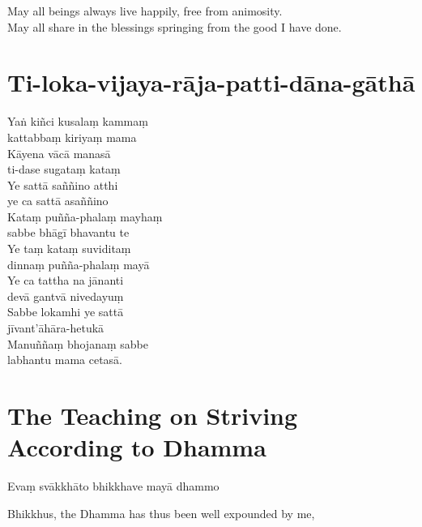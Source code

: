 \begin{english}
  May all beings always live happily, free from animosity.\\
  May all share in the blessings springing from the good I have done.
\end{english}

\section{Ti-loka-vijaya-rāja-patti-dāna-gāthā}


Yaṅ kiñci kusalaṃ kammaṃ\\
\vin kattabbaṃ kiriyaṃ mama\\
Kāyena vācā manasā\\
\vin ti-dase sugataṃ kataṃ\\
Ye sattā saññino atthi\\
\vin ye ca sattā asaññino\\
Kataṃ puñña-phalaṃ mayhaṃ\\
\vin sabbe bhāgī bhavantu te\\
Ye taṃ kataṃ suviditaṃ\\
\vin dinnaṃ puñña-phalaṃ mayā\\
Ye ca tattha na jānanti\\
\vin devā gantvā nivedayuṃ\\
Sabbe lokamhi ye sattā\\
\vin jīvant'āhāra-hetukā\\
Manuññaṃ bhojanaṃ sabbe\\
\vin labhantu mama cetasā.


\section[Striving According to Dhamma]{The Teaching on Striving According to Dhamma}


\begin{leader}
\end{leader}

Evaṃ svākkhāto bhikkhave mayā dhammo

\begin{english}
  Bhikkhus, the Dhamma has thus been well expounded by me,
\end{english}

